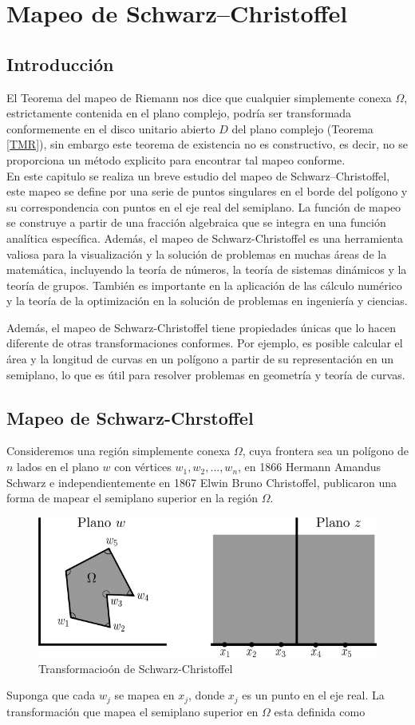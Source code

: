 \chapter{Mapeo de Schwarz–Christoffel} \label{Schwarz–Christoffel }

\section{Introducción}\label{intro_SC}
El Teorema del mapeo de Riemann nos dice que cualquier simplemente conexa $\Omega$, estrictamente contenida en el plano complejo, podría ser transformada conformemente en el disco unitario abierto $D$ del plano complejo (Teorema \ref{TMR}), sin embargo este teorema de existencia no es constructivo, es decir, no se proporciona un método explicito para encontrar tal mapeo conforme.\\
En este capitulo se realiza un breve estudio del mapeo de Schwarz–Christoffel, este mapeo se define por una serie de puntos singulares en el borde del polígono y su correspondencia con puntos en el eje real del semiplano. La función de mapeo se construye a partir de una fracción algebraica que se integra en una función analítica específica. Además, el mapeo de Schwarz-Christoffel es una herramienta valiosa para la visualización y la solución de problemas en muchas áreas de la matemática, incluyendo la teoría de números, la teoría de sistemas dinámicos y la teoría de grupos. También es importante en la aplicación de las cálculo numérico y la teoría de la optimización en la solución de problemas en ingeniería y ciencias.

Además, el mapeo de Schwarz-Christoffel tiene propiedades únicas que lo hacen diferente de otras transformaciones conformes. Por ejemplo, es posible calcular el área y la longitud de curvas en un polígono a partir de su representación en un semiplano, lo que es útil para resolver problemas en geometría y teoría de curvas.

\section{Mapeo de Schwarz-Chrstoffel}
Consideremos una región simplemente conexa $\Omega$, cuya frontera sea un polígono de $n$ lados en el plano $w$ con vértices $w_1,w_2,\ldots,w_n$, en 1866 Hermann Amandus Schwarz e independientemente en 1867  Elwin Bruno Christoffel, publicaron una forma de mapear  el semiplano superior en  la región $\Omega$.
\begin{figure}[h!]
	\centering
	\includegraphics[width=0.7\linewidth]{img/sc}
	\caption{Transformacioón de Schwarz-Christoffel}
	\label{fig:sc}
\end{figure}
Suponga que cada $w_j$ se mapea en $x_j$, donde $x_j$ es un punto en el eje real.
La transformación que mapea el semiplano superior en   $\Omega$ esta definida  como 

